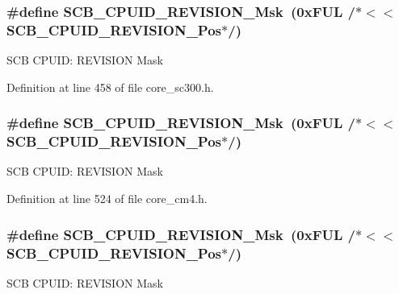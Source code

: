 \subsubsection[{\texorpdfstring{S\+C\+B\+\_\+\+C\+P\+U\+I\+D\+\_\+\+R\+E\+V\+I\+S\+I\+O\+N\+\_\+\+Msk}{SCB_CPUID_REVISION_Msk}}]{\setlength{\rightskip}{0pt plus 5cm}\#define S\+C\+B\+\_\+\+C\+P\+U\+I\+D\+\_\+\+R\+E\+V\+I\+S\+I\+O\+N\+\_\+\+Msk~(0x\+F\+U\+L /$\ast$$<$$<$ S\+C\+B\+\_\+\+C\+P\+U\+I\+D\+\_\+\+R\+E\+V\+I\+S\+I\+O\+N\+\_\+\+Pos$\ast$/)}\hypertarget{group___c_m_s_i_s___s_c_b_ga2ec0448b6483f77e7f5d08b4b81d85df}{}\label{group___c_m_s_i_s___s_c_b_ga2ec0448b6483f77e7f5d08b4b81d85df}
S\+CB C\+P\+U\+ID\+: R\+E\+V\+I\+S\+I\+ON Mask 

Definition at line 458 of file core\+\_\+sc300.\+h.

\subsubsection[{\texorpdfstring{S\+C\+B\+\_\+\+C\+P\+U\+I\+D\+\_\+\+R\+E\+V\+I\+S\+I\+O\+N\+\_\+\+Msk}{SCB_CPUID_REVISION_Msk}}]{\setlength{\rightskip}{0pt plus 5cm}\#define S\+C\+B\+\_\+\+C\+P\+U\+I\+D\+\_\+\+R\+E\+V\+I\+S\+I\+O\+N\+\_\+\+Msk~(0x\+F\+U\+L /$\ast$$<$$<$ S\+C\+B\+\_\+\+C\+P\+U\+I\+D\+\_\+\+R\+E\+V\+I\+S\+I\+O\+N\+\_\+\+Pos$\ast$/)}\hypertarget{group___c_m_s_i_s___s_c_b_ga2ec0448b6483f77e7f5d08b4b81d85df}{}\label{group___c_m_s_i_s___s_c_b_ga2ec0448b6483f77e7f5d08b4b81d85df}
S\+CB C\+P\+U\+ID\+: R\+E\+V\+I\+S\+I\+ON Mask 

Definition at line 524 of file core\+\_\+cm4.\+h.

\subsubsection[{\texorpdfstring{S\+C\+B\+\_\+\+C\+P\+U\+I\+D\+\_\+\+R\+E\+V\+I\+S\+I\+O\+N\+\_\+\+Msk}{SCB_CPUID_REVISION_Msk}}]{\setlength{\rightskip}{0pt plus 5cm}\#define S\+C\+B\+\_\+\+C\+P\+U\+I\+D\+\_\+\+R\+E\+V\+I\+S\+I\+O\+N\+\_\+\+Msk~(0x\+F\+U\+L /$\ast$$<$$<$ S\+C\+B\+\_\+\+C\+P\+U\+I\+D\+\_\+\+R\+E\+V\+I\+S\+I\+O\+N\+\_\+\+Pos$\ast$/)}\hypertarget{group___c_m_s_i_s___s_c_b_ga2ec0448b6483f77e7f5d08b4b81d85df}{}\label{group___c_m_s_i_s___s_c_b_ga2ec0448b6483f77e7f5d08b4b81d85df}
S\+CB C\+P\+U\+ID\+: R\+E\+V\+I\+S\+I\+ON Mask 

